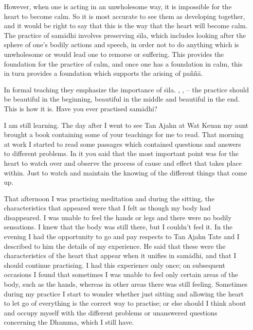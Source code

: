However, when one is acting in an unwholesome way, it is impossible for the heart to become calm. So it is most accurate to see them as developing together, and it would be right to say that this is the way that the heart will become calm. The practice of sam\=adhi involves preserving s\={\i}la, which includes looking after the sphere of one's bodily actions and speech, in order not to do anything which is unwholesome or would lead one to remorse or suffering. This provides the foundation for the practice of calm, and once one has a foundation in calm, this in turn provides a foundation which supports the arising of pa\~n\~n\=a.

In formal teaching they emphasize the importance of s\={\i}la. ,     ,  -- the practice should be beautiful in the beginning, beautiful in the middle and beautiful in the end. This is how it is. Have you ever practised sam\=adhi?

 I am still learning. The day after I went to see Tan Ajahn at Wat Keuan my aunt brought a book containing some of your teachings for me to read. That morning at work I started to read some passages which contained questions and answers to different problems. In it you said that the most important point was for the heart to watch over and observe the process of cause and effect that takes place within. Just to watch and maintain the knowing of the different things that come up.

That afternoon I was practising meditation and during the sitting, the characteristics that appeared were that I felt as though my body had disappeared. I was unable to feel the hands or legs and there were no bodily sensations. I knew that the body was still there, but I couldn't feel it. In the evening I had the opportunity to go and pay respects to Tan Ajahn Tate and I described to him the details of my experience. He said that these were the characteristics of the heart that appear when it unifies in sam\=adhi, and that I should continue practising. I had this experience only once; on subsequent occasions I found that sometimes I was unable to feel only certain areas of the body, such as the hands, whereas in other areas there was still feeling. Sometimes during my practice I start to wonder whether just sitting and allowing the heart to let go of everything is the correct way to practise; or else should I think about and occupy myself with the different problems or unanswered questions concerning the Dhamma, which I still have.

